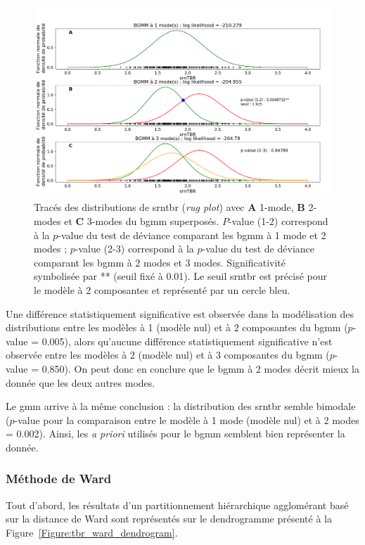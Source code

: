 \begin{figure}[h!]
  \centering
	\includegraphics[width=1.0\linewidth]{figures/chapter-4/tbr-bgmm} 
  \caption{Tracés des distributions de \gls{srntbr} (\textit{rug plot}) avec \textbf{A} 1-mode, \textbf{B} 2-modes et \textbf{C} 3-modes du \gls{bgmm} superposés. $P$-value (1-2) correspond
	à la $p$-value du test de déviance comparant les \gls{bgmm} à 1 mode et 2 modes ; $p$-value (2-3) correspond à la $p$-value du test de déviance comparant les \gls{bgmm}
	à 2 modes et 3 modes. Significativité symbolisée par ** (seuil fixé à 0.01). Le seuil \gls{srntbr} est précisé pour le modèle à 2 composantes et représenté par un cercle bleu.}
  \label{Figure:tbr_bgmm} 
\end{figure}

Une différence statistiquement significative est observée dans la modélisation des distributions entre les modèles à 1 (modèle nul) et à 2 composantes 
du \gls{bgmm} ($p$-value = 0.005), alors qu'aucune différence statistiquement significative n'est observée entre les modèles à 2 (modèle nul) 
et à 3 composantes du \gls{bgmm} ($p$-value = 0.850). On peut donc en conclure que le \gls{bgmm} à 2 modes décrit mieux la donnée que les deux
autres modes. 

Le \gls{gmm} arrive à la même conclusion : la distribution des \gls{srntbr} semble bimodale ($p$-value pour la comparaison
entre le modèle à 1 mode (modèle nul) et à 2 modes = 0.002). Ainsi, les \textit{a priori} utilisés pour le \gls{bgmm} semblent bien 
représenter la donnée. 

\subsubsection{Méthode de Ward}
Tout d'abord, les résultats d'un partitionnement hiérarchique agglomérant basé sur la distance de Ward sont représentés sur le dendrogramme présenté à la 
Figure~\ref{Figure:tbr_ward_dendrogram}. 

